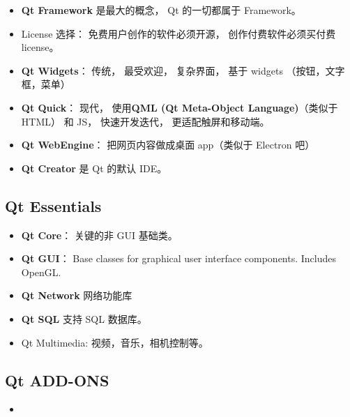 
\begin{issues}
\issueDraft
\end{issues}

\begin{itemize}
\item \textbf{Qt Framework} 是最大的概念， Qt 的一切都属于 Framework。
\item License 选择： 免费用户创作的软件必须开源， 创作付费软件必须买付费 license。
\item \textbf{Qt Widgets}： 传统， 最受欢迎， 复杂界面， 基于 widgets （按钮，文字框，菜单）
\item \textbf{Qt Quick}： 现代， 使用\textbf{QML (Qt Meta-Object Language)}（类似于 HTML） 和 JS， 快速开发迭代， 更适配触屏和移动端。
\item \textbf{Qt WebEngine}： 把网页内容做成桌面 app（类似于 Electron 吧）
\item \textbf{Qt Creator} 是 Qt 的默认 IDE。
\end{itemize}

\subsection{Qt Essentials}
\begin{itemize}
\item \textbf{Qt Core}： 关键的非 GUI 基础类。
\item \textbf{Qt GUI}： Base classes for graphical user interface components. Includes OpenGL.
\item \textbf{Qt Network} 网络功能库
\item \textbf{Qt SQL} 支持 SQL 数据库。
\item Qt Multimedia: 视频，音乐，相机控制等。
\end{itemize}

\subsection{Qt ADD-ONS}
\begin{itemize}
\item 
\end{itemize}
